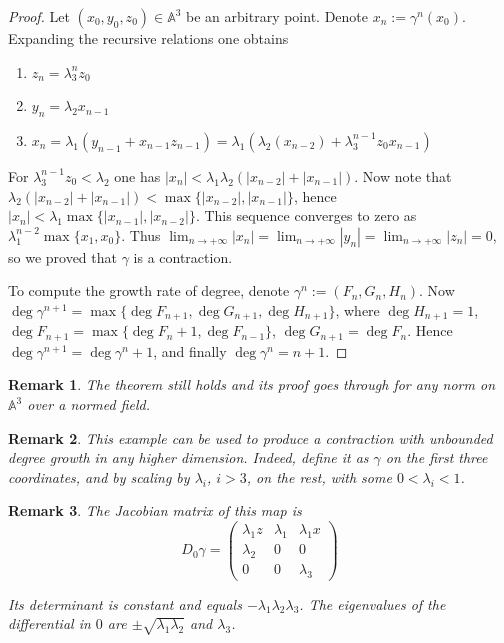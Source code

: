 \documentclass[12pt]{article}
\newtheorem{remark}{Remark}
\begin{document}
\begin{proof}
Let $(x_0,y_0,z_0)\in \mathbb A^3$ be an arbitrary point.
Denote $x_n:=\gamma^n(x_0)$. Expanding the recursive relations one obtains

\begin{enumerate}
\item $  z_n=\lambda_3^n z_0$
\item $ y_n=\lambda_2 x_{n-1} $
\item $ x_n=\lambda_1(y_{n-1}+x_{n-1}z_{n-1})= \lambda_1(\lambda_2(x_{n-2})+\lambda_3^{n-1}z_0 x_{n-1})$
\end{enumerate}

For $\lambda_3^{n-1}z_0<\lambda_2$ one has $  |x_n|< \lambda_1 \lambda_2(|x_{n-2}|+|x_{n-1}|)$. Now note that $ \lambda_2( |x_{n-2}|+|x_{n-1}|)<\max \{|x_{n-2}|,|x_{n-1}|\} $, hence $ |x_n|<\lambda_1\max \{|x_{n-1}|,|x_{n-2}|\}$. This sequence converges to zero as $ \lambda_1^{n-2}\max\{x_1,x_0\}$. Thus $\lim_{n\to +\infty}|x_n|=\lim_{n\to +\infty}|y_n|=\lim_{n\to +\infty}|z_n|=0$, so we proved that $ \gamma $ is a contraction.

To compute the growth rate of degree, denote $ \gamma^n:=(F_n,G_n,H_n)$. Now
$ \deg \gamma^{n+1}=\max \{\deg F_{n+1},\deg G_{n+1},\deg H_{n+1}\}$, where $\deg H_{n+1}=1$, $ \deg F_{n+1} =\max\{\deg F_{n}+1, \deg F_{n-1}\}$, $ \deg G_{n+1}=\deg F_n$. Hence $  \deg \gamma^{n+1}=\deg \gamma^n+1$, and finally $ \deg \gamma^n = n+1 $.

\end{proof}

\begin{remark}
The theorem still holds and its proof goes through for any norm on $ \mathbb A^3 $ over a normed field.
\end{remark}

\begin{remark}
This example can be used to produce a contraction with unbounded degree growth in any higher dimension. Indeed, define it as $ \gamma $ on the first three coordinates, and by scaling by $\lambda_i$, $ i>3 $, on the rest, with some $0 <\lambda_i< 1$.
\end{remark}

\begin{remark}
The Jacobian matrix of this map is
$$D_0\gamma =\begin{pmatrix}
\lambda_1 z & \lambda_1 & \lambda_1 x\\
\lambda_2 & 0 & 0\\
0 & 0 & \lambda_3
\end{pmatrix} $$

Its determinant is constant and equals $ -\lambda_1 \lambda_2 \lambda_3 $. The eigenvalues of the differential in $0$ are $\pm \sqrt{\lambda_1\lambda_2}$ and $\lambda_3$.
\end{remark}
\end{document}
